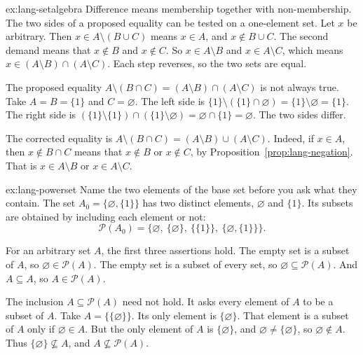 \begin{solution}{ex:lang-setalgebra}
\idea Difference means membership together with non-membership. The two sides of a proposed equality can be tested on a one-element set.
\writeup Let $x$ be arbitrary. Then $x\in A\setminus(B\cup C)$ means $x\in A$, and $x\notin B\cup C$. The second demand means that $x\notin B$ and $x\notin C$. So $x\in A\setminus B$ and $x\in A\setminus C$, which means $x\in(A\setminus B)\cap(A\setminus C)$. Each step reverses, so the two sets are equal.

The proposed equality $A\setminus(B\cap C)=(A\setminus B)\cap(A\setminus C)$ is not always true. Take $A=B=\{1\}$ and $C=\varnothing$. The left side is $\{1\}\setminus(\{1\}\cap\varnothing)=\{1\}\setminus\varnothing=\{1\}$. The right side is $(\{1\}\setminus\{1\})\cap(\{1\}\setminus\varnothing)=\varnothing\cap\{1\}=\varnothing$. The two sides differ.

The corrected equality is $A\setminus(B\cap C)=(A\setminus B)\cup(A\setminus C)$. Indeed, if $x\in A$, then $x\notin B\cap C$ means that $x\notin B$ or $x\notin C$, by Proposition~\ref{prop:lang-negation}. That is $x\in A\setminus B$ or $x\in A\setminus C$.
\end{solution}

\begin{solution}{ex:lang-powerset}
\idea Name the two elements of the base set before you ask what they contain.
\writeup The set $A_0=\{\varnothing,\{1\}\}$ has two distinct elements, $\varnothing$ and $\{1\}$. Its subsets are obtained by including each element or not:
\[
\mathcal P(A_0)=\bigl\{\varnothing,\ \{\varnothing\},\ \{\{1\}\},\ \{\varnothing,\{1\}\}\bigr\}.
\]

For an arbitrary set $A$, the first three assertions hold. The empty set is a subset of $A$, so $\varnothing\in\mathcal P(A)$. The empty set is a subset of every set, so $\varnothing\subseteq\mathcal P(A)$. And $A\subseteq A$, so $A\in\mathcal P(A)$.

The inclusion $A\subseteq\mathcal P(A)$ need not hold. It asks every element of $A$ to be a subset of $A$. Take $A=\{\{\varnothing\}\}$. Its only element is $\{\varnothing\}$. That element is a subset of $A$ only if $\varnothing\in A$. But the only element of $A$ is $\{\varnothing\}$, and $\varnothing\ne\{\varnothing\}$, so $\varnothing\notin A$. Thus $\{\varnothing\}\not\subseteq A$, and $A\not\subseteq\mathcal P(A)$.
\end{solution}

